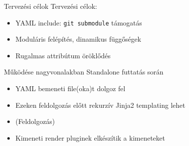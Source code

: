 \documentclass[aspectratio=169]{beamer}
\begin{document}
\begin{frame}{Tervezési célok}
	Tervezési célok:
		\pause
	\begin{itemize}
		\item YAML include: \texttt{git submodule} támogatás
		\pause
		\item Moduláris felépítés, dinamikus függőségek
		\pause
		\item Rugalmas attribútum öröklődés
	\end{itemize}
\end{frame}

\begin{frame}{Működése nagyvonalakban}
	Standalone futtatás során
	\pause
	\begin{itemize}
		\item YAML bemeneti file(oka)t dolgoz fel
		\pause
		\item Ezeken feldolgozás előtt rekurzív Jinja2 templating lehet
		\pause
		\item (Feldolgozás)
		\pause
		\item Kimeneti render pluginek elkészítik a kimeneteket
	\end{itemize}
\end{frame}

\begin{frame}[plain]
    \fontsize{50}{60} 
\end{frame}
\end{document}
